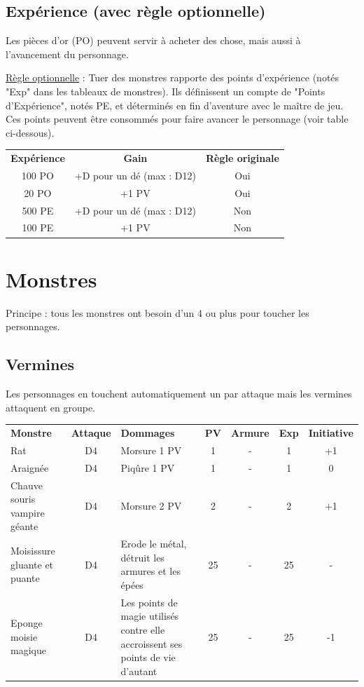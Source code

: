 \documentclass[a4paper, 11pt, twoside]{article}
\begin{document}
\subsection{Expérience (avec règle optionnelle)}
\label{sec:org3406569}

Les pièces d'or (PO) peuvent servir à acheter des chose, mais aussi à l'avancement du personnage.

\uline{Règle optionnelle} : Tuer des monstres rapporte des points d'expérience (notés "Exp" dans les tableaux de monstres). Ils définissent un compte de "Points d'Expérience", notés PE, et déterminés en fin d'aventure avec le maître de jeu. Ces points peuvent être consommés pour faire avancer le personnage (voir table ci-dessous).

\newpage

\begin{longtable}{ccc}
\textbf{Expérience} & \textbf{Gain} & \textbf{Règle originale}\\
100 PO & +D pour un dé (max : D12) & Oui\\
20 PO & +1 PV & Oui\\
500 PE & +D pour un dé (max : D12) & Non\\
100 PE & +1 PV & Non\\
\end{longtable}

\section{Monstres}
\label{sec:orga1e9d29}

Principe : tous les monstres ont besoin d'un 4 ou plus pour toucher les personnages.

\subsection{Vermines}
\label{sec:org1247139}

Les personnages en touchent automatiquement un par attaque mais les vermines attaquent en groupe.

\begin{longtable}{p{4cm}cp{5cm}cccc}
\textbf{Monstre} & \textbf{Attaque} & \textbf{Dommages} & \textbf{PV} & \textbf{Armure} & \textbf{Exp} & \textbf{Initiative}\\
Rat & D4 & Morsure 1 PV & 1 & - & 1 & +1\\
Araignée & D4 & Piqûre 1 PV & 1 & - & 1 & 0\\
Chauve souris vampire géante & D4 & Morsure 2 PV & 2 & - & 2 & +1\\
Moisissure gluante et puante & D4 & Erode le métal, détruit les armures et les épées & 25 & - & 25 & -\\
Eponge moisie magique & D4 & Les points de magie utilisés contre elle accroissent ses points de vie d'autant & 25 & - & 25 & -1\\
\end{longtable}
\end{document}

